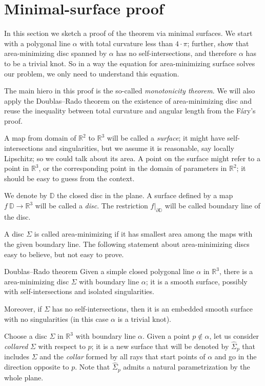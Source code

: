  \section{Minimal-surface proof}

In this section we sketch a proof of the theorem via minimal surfaces.
We start with a polygonal line $\alpha$ with total curvature less than $4\cdot\pi$;
further, show that area-minimizing disc spanned by $\alpha$ has no self-intersections, and therefore $\alpha$ has to be a trivial knot.
So in a way the equation for area-minimizing surface solves our problem, we only need to understand this equation.

The main hiero in this proof is the so-called \emph{monotonicity theorem}.
We will also apply the Doublas--Rado theorem on the existence of area-minimizing disc and reuse the inequality between total curvature and angular length from the F\'ary's proof.

A map from domain of $\mathbb{R}^2$ to $\mathbb{R}^3$ will be called a \emph{surface};
it might have self-intersections and singularities, but we assume it is reasonable, say locally Lipschitz; so we could talk about its area.
A point on the surface might refer to a point in $\mathbb{R}^3$, or the corresponding point in the domain of parameters in $\mathbb{R}^2$;
it should be easy to guess from the context.

We denote by $\mathbb{D}$ the closed disc in the plane.
A surface defined by a map $f\:\mathbb{D}\to\mathbb{R}^3$ will be called a \emph{disc}.
The restriction $f|_{\partial \mathbb{D}}$ will be called boundary line of the disc.

A disc $\Sigma$ is called area-minimizing if it has smallest area among the maps with the given boundary line.
The following statement about area-minimizing discs easy to believe, but not easy to prove. %

\begin{thm}{Doublas--Rado theorem}\label{thm:min-exists}
Given a simple closed polygonal line $\alpha$ in $\mathbb{R}^3$, there is a area-minimizing disc $\Sigma$ with boundary line $\alpha$; it is a smooth surface, possibly with self-intersections and isolated singularities.

Moreover, if $\Sigma$ has no self-intersections, then it is an embedded smooth surface with no singularities (in this case $\alpha$ is a trivial knot).
\end{thm}

Choose a disc $\Sigma$ in $\mathbb{R}^3$ with boundary line $\alpha$.
Given a point $p\notin \alpha$, let us consider \emph{collared} $\Sigma$ with respect to $p$;
it is a new surface that will be denoted by $\hat\Sigma_p$ that includes $\Sigma$ and the \emph{collar} formed by all rays that start points of $\alpha$ and go in the direction opposite to $p$.
Note that $\hat\Sigma_p$ admits a natural parametrization by the whole plane.

